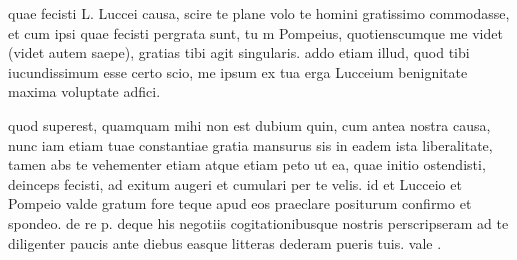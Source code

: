 


 quae fecisti L. Luccei causa, scire te plane volo te homini gratissimo commodasse, et cum ipsi quae fecisti pergrata sunt, tu m Pompeius, quotienscumque me videt (videt autem saepe), gratias tibi agit singularis. addo etiam illud, quod tibi iucundissimum esse certo scio, me ipsum ex tua erga Lucceium benignitate maxima voluptate adfici.

 quod superest, quamquam mihi non est dubium quin, cum antea nostra causa, nunc iam etiam tuae constantiae gratia mansurus sis in eadem ista liberalitate, tamen abs te vehementer etiam atque etiam peto ut ea, quae initio ostendisti, deinceps fecisti, ad exitum augeri et cumulari per te velis. id et Lucceio et Pompeio valde gratum fore teque apud eos praeclare positurum confirmo et spondeo. de re p. deque his negotiis cogitationibusque nostris perscripseram ad te diligenter paucis ante diebus easque litteras dederam pueris tuis. vale .

